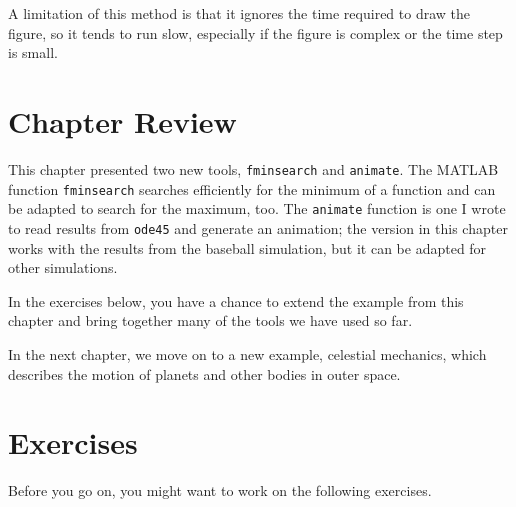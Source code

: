 A limitation of this method is that it ignores the time required to
draw the figure, so it tends to run slow, especially if the figure is
complex or the time step is small.

\section{Chapter Review}

This chapter presented two new tools, \lstinline{fminsearch} and \lstinline{animate}.
The MATLAB function \lstinline{fminsearch} searches efficiently for the minimum of a function and can be adapted to search for the maximum, too.
The \lstinline{animate} function is one I wrote to read results from \lstinline{ode45} and generate an animation; the version in this chapter works with the results from the baseball simulation, but it can be adapted for other simulations.

In the exercises below, you have a chance to extend the example from this chapter and bring together many of the tools we have used so far.

In the next chapter, we move on to a new example, celestial mechanics, which describes the motion of planets and other bodies in outer space.


\section{Exercises}

Before you go on, you might want to work on the following exercises.

